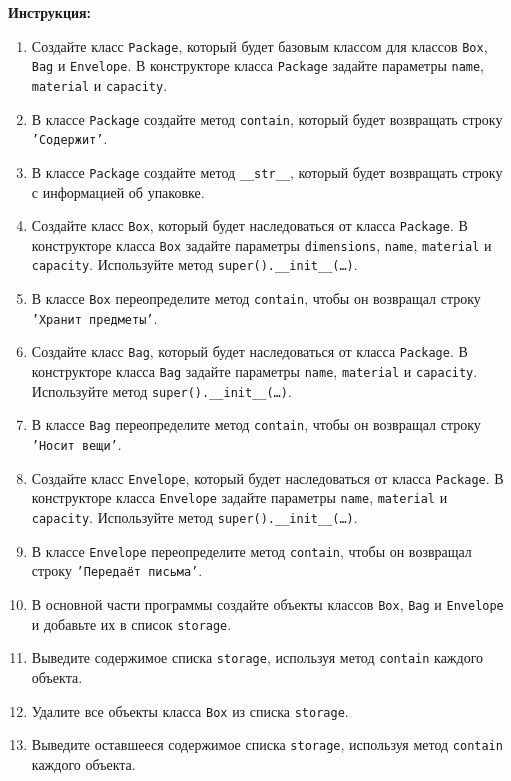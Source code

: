 \begin{enumerate}
\textbf{Инструкция:}
\begin{enumerate}
    \item Создайте класс \texttt{Package}, который будет базовым классом для классов \texttt{Box}, \texttt{Bag} и \texttt{Envelope}. В конструкторе класса \texttt{Package} задайте параметры \texttt{name}, \texttt{material} и \texttt{capacity}.
    \item В классе \texttt{Package} создайте метод \texttt{contain}, который будет возвращать строку \texttt{'Содержит'}.
    \item В классе \texttt{Package} создайте метод \texttt{\_\_str\_\_}, который будет возвращать строку с информацией об упаковке.
    \item Создайте класс \texttt{Box}, который будет наследоваться от класса \texttt{Package}. В конструкторе класса \texttt{Box} задайте параметры \texttt{dimensions}, \texttt{name}, \texttt{material} и \texttt{capacity}. Используйте метод \texttt{super().\_\_init\_\_(\ldots)}.
    \item В классе \texttt{Box} переопределите метод \texttt{contain}, чтобы он возвращал строку \texttt{'Хранит предметы'}.
    \item Создайте класс \texttt{Bag}, который будет наследоваться от класса \texttt{Package}. В конструкторе класса \texttt{Bag} задайте параметры \texttt{name}, \texttt{material} и \texttt{capacity}. Используйте метод \texttt{super().\_\_init\_\_(\ldots)}.
    \item В классе \texttt{Bag} переопределите метод \texttt{contain}, чтобы он возвращал строку \texttt{'Носит вещи'}.
    \item Создайте класс \texttt{Envelope}, который будет наследоваться от класса \texttt{Package}. В конструкторе класса \texttt{Envelope} задайте параметры \texttt{name}, \texttt{material} и \texttt{capacity}. Используйте метод \texttt{super().\_\_init\_\_(\ldots)}.
    \item В классе \texttt{Envelope} переопределите метод \texttt{contain}, чтобы он возвращал строку \texttt{'Передаёт письма'}.
    \item В основной части программы создайте объекты классов \texttt{Box}, \texttt{Bag} и \texttt{Envelope} и добавьте их в список \texttt{storage}.
    \item Выведите содержимое списка \texttt{storage}, используя метод \texttt{contain} каждого объекта.
    \item Удалите все объекты класса \texttt{Box} из списка \texttt{storage}.
    \item Выведите оставшееся содержимое списка \texttt{storage}, используя метод \texttt{contain} каждого объекта.

\end{enumerate}
\end{enumerate}
